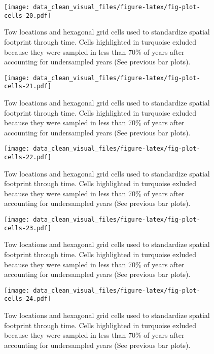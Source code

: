 \documentclass[
]{article}
\begin{document}
\begin{figure}
\centering
\texttt{[image: data\_clean\_visual\_files/figure-latex/fig-plot-cells-20.pdf]}
\caption{\label{fig:fig-plot-cells-20}Tow locations and hexagonal grid cells used to standardize spatial footprint through time. Cells highlighted in turquoise exluded because they were sampled in less than 70\% of years after accounting for undersampled years (See previous bar plots).}
\end{figure}

\begin{figure}
\centering
\texttt{[image: data\_clean\_visual\_files/figure-latex/fig-plot-cells-21.pdf]}
\caption{\label{fig:fig-plot-cells-21}Tow locations and hexagonal grid cells used to standardize spatial footprint through time. Cells highlighted in turquoise exluded because they were sampled in less than 70\% of years after accounting for undersampled years (See previous bar plots).}
\end{figure}

\begin{figure}
\centering
\texttt{[image: data\_clean\_visual\_files/figure-latex/fig-plot-cells-22.pdf]}
\caption{\label{fig:fig-plot-cells-22}Tow locations and hexagonal grid cells used to standardize spatial footprint through time. Cells highlighted in turquoise exluded because they were sampled in less than 70\% of years after accounting for undersampled years (See previous bar plots).}
\end{figure}

\begin{figure}
\centering
\texttt{[image: data\_clean\_visual\_files/figure-latex/fig-plot-cells-23.pdf]}
\caption{\label{fig:fig-plot-cells-23}Tow locations and hexagonal grid cells used to standardize spatial footprint through time. Cells highlighted in turquoise exluded because they were sampled in less than 70\% of years after accounting for undersampled years (See previous bar plots).}
\end{figure}

\begin{figure}
\centering
\texttt{[image: data\_clean\_visual\_files/figure-latex/fig-plot-cells-24.pdf]}
\caption{\label{fig:fig-plot-cells-24}Tow locations and hexagonal grid cells used to standardize spatial footprint through time. Cells highlighted in turquoise exluded because they were sampled in less than 70\% of years after accounting for undersampled years (See previous bar plots).}
\end{figure}
\end{document}

